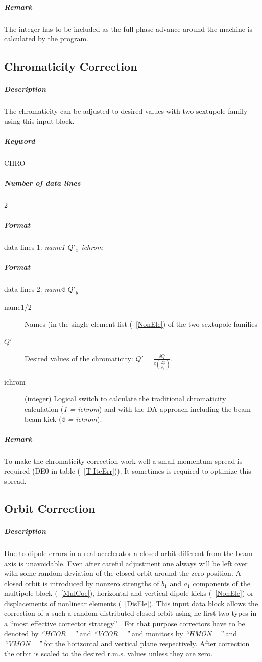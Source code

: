 \subparagraph{Remark} The integer has to be included as the full phase
advance around the machine is calculated by the program.

\subsection{Chromaticity Correction} \label{ChrCor}

\subparagraph{Description} The chromaticity can be adjusted
to desired values with two sextupole family using this input block.

\subparagraph{Keyword} CHRO \subparagraph{Number of data lines} 2

\subparagraph{Format} data lines 1: {\em name1 $Q'_x$ ichrom}
\subparagraph{Format} data lines 2: {\em name2 $Q'_y$}

\begin{description}
\item [name1/2] Names (in the single element list (~\ref{NonEle}) of the
  two sextupole families
\item [$Q'$] Desired values of the chromaticity: $Q'=\frac{\delta
    Q}{\delta (\frac{\Delta p}{p_o})}$.
\item [ichrom] (integer) Logical switch to calculate the traditional
  chromaticity calculation ({\it 1 = ichrom}) and with the DA
  approach including the beam-beam kick ({\it 2 = ichrom}).
\end{description}
\subparagraph{Remark} To make the chromaticity correction work well a
small momentum spread is required (DE0 in table (~\ref{T-IteErr})). It
sometimes is required to optimize this spread.

\subsection{Orbit Correction} \label{OrbCorr}

\subparagraph{Description} Due to dipole errors in a real accelerator
a closed orbit different from the beam axis is unavoidable. Even after
careful adjustment one always will be left over with some random
deviation of the closed orbit around the zero position. A closed orbit
is introduced by nonzero strengths of $ b_{1} $ and $ a_{1} $
components of the multipole block (~\ref{MulCoe}), horizontal and
vertical dipole kicks (~\ref{NonEle}) or displacements of nonlinear
elements (~\ref{DisEle}).  This input data block allows the correction
of a such a random distributed closed orbit using he first two types
in a ``most effective corrector strategy'' \cite{Auti}. For that
purpose correctors have to be denoted by {\em ``HCOR= ''} \/and {\em
  ``VCOR= ''} \/and monitors by {\em ``HMON= ''} \/and {\em ``VMON=
  ''} \/for the horizontal and vertical plane respectively. After
correction the orbit is scaled to the desired r.m.s. values unless they
are zero.

